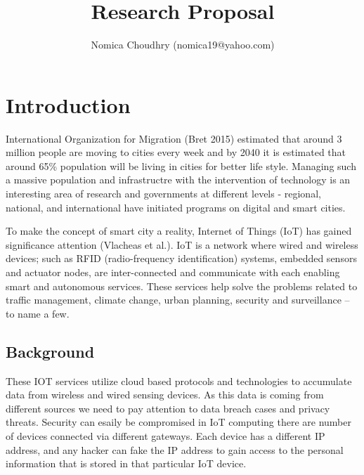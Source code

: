 \documentclass[10pt]{llncs}
\begin{document}
%
\title{Research Proposal}
%
\author{
Nomica Choudhry (\selectfont\ttfamily\upshape nomica19@yahoo.com)\\
}
\maketitle

%
\section{Introduction}
International Organization for Migration (Bret 2015) estimated that around 3 million people are moving to cities every week and by 2040 it is estimated that around 65\% population will be living in cities for better life style. Managing such a massive population and infrastructre with the intervention of technology is an interesting area of research and governments at different levels - regional, national, and international have initiated programs on digital and smart cities.

To make the concept of smart city a reality, Internet of Things (IoT) has gained significance attention (Vlacheas et al.). IoT is a network where wired and wireless devices; such as RFID (radio-frequency identification) systems, embedded sensors and actuator nodes, are inter-connected and communicate with each enabling smart and autonomous services. These services help solve the problems related to traffic management, climate change, urban planning, security and surveillance – to name a few. 

%
\subsection{Background}
These IOT services utilize cloud based protocols and technologies to accumulate data from wireless and wired sensing devices. As this data is coming from different sources we need to pay attention to data breach cases and privacy threats. Security can esaily be compromised in IoT computing there are number of devices connected via different gateways. Each device has a different IP address, and any hacker can fake the IP address to gain access to the personal information that is stored in that particular IoT device.
\end{document}
